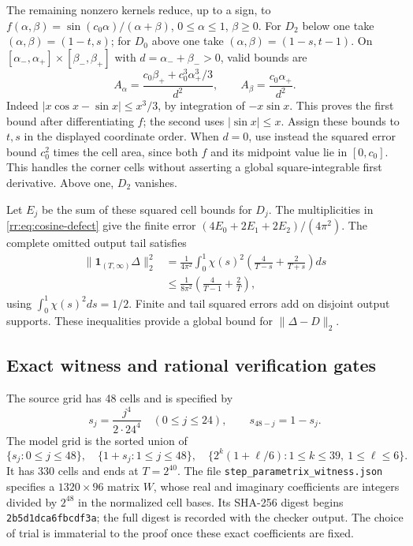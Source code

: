 The remaining nonzero kernels reduce, up to a sign, to
$f(\alpha,\beta)=\sin(c_0\alpha)/(\alpha+\beta)$,
$0\le\alpha\le1$, $\beta\ge0$.
For $D_2$ below one take $(\alpha,\beta)=(1-t,s)$; for $D_0$ above
one take $(\alpha,\beta)=(1-s,t-1)$.
On $[\alpha_-,\alpha_+]\times[\beta_-,\beta_+]$ with
$d=\alpha_-+\beta_->0$, valid bounds are
\begin{equation}\label{rr:eq:corner-derivative-bounds}
 A_\alpha=\frac{c_0\beta_++c_0^3\alpha_+^3/3}{d^2},
 \qquad A_\beta=\frac{c_0\alpha_+}{d^2}.
\end{equation}
Indeed $|x\cos x-\sin x|\le x^3/3$, by integration of $-x\sin x$.
This proves the first bound after differentiating $f$; the second
uses $|\sin x|\le x$.  Assign these bounds to $t,s$ in the displayed
coordinate order.  When $d=0$, use instead the squared error bound
$c_0^2$ times the cell area, since both $f$ and its midpoint value
lie in $[0,c_0]$.  This handles the corner cells without asserting a
global square-integrable first derivative.  Above one, $D_2$ vanishes.

Let $E_j$ be the sum of these squared cell bounds for $D_j$.
The multiplicities in \eqref{rr:eq:cosine-defect} give the finite error
$(4E_0+2E_1+2E_2)/(4\pi^2)$.
The complete omitted output tail satisfies
\begin{align}
 \|\mathbf1_{(T,\infty)}\Delta\|_2^2
 &=\frac1{4\pi^2}\int_0^1\chi(s)^2
                     \left(\frac4{T-s}+\frac2{T+s}\right)ds\nonumber\\
 &\le\frac1{8\pi^2}\left(\frac4{T-1}+\frac2T\right),
 \label{rr:eq:global-defect-tail}
\end{align}
using $\int_0^1\chi(s)^2ds=1/2$.
Finite and tail squared errors add on disjoint output supports.
These inequalities provide a global bound for $\|\Delta-D\|_2$.

\subsection{Exact witness and rational verification gates}

The source grid has 48 cells and is specified by
\[
 s_j=\frac{j^4}{2\cdot24^4}\quad(0\le j\le24),\qquad
 s_{48-j}=1-s_j.
\]
The model grid is the sorted union of
\[
 \{s_j:0\le j\le48\},\quad
 \{1+s_j:1\le j\le48\},\quad
 \{2^k(1+\ell/6):1\le k\le39,\ 1\le\ell\le6\}.
\]
It has 330 cells and ends at $T=2^{40}$.
The file \texttt{step\_parametrix\_witness.json} specifies a
$1320\times96$ matrix $W$, whose real and imaginary coefficients are
integers divided by $2^{48}$ in the normalized cell bases.
Its SHA-256 digest begins \texttt{2b5d1dca6fbcdf3a}; the full digest is
recorded with the checker output.  The choice of trial is immaterial to
the proof once these exact coefficients are fixed.


